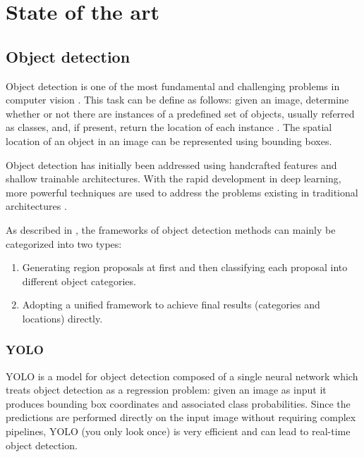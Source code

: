 \chapter{State of the art}
\label{chap:sota}

\section{Object detection}

Object detection is one of the most fundamental and challenging problems in computer vision \cite{zou2019object}. This task can be define as follows: given an image, determine whether or not there are instances of a predefined set of objects, usually referred as classes, and, if present, return the location of each instance \cite{liu2020deep}. The spatial location of an object in an image can be represented using bounding boxes.

Object detection has initially been addressed using handcrafted features and shallow trainable architectures.
With the rapid development in deep learning, more powerful techniques are used to address the problems existing in traditional architectures \cite{zhao2019object}. 

As described in \cite{zhao2019object}, the frameworks of object detection methods can mainly be categorized into two types:
\begin{enumerate}
    \item Generating region proposals at first and then classifying each proposal into different object categories.
    \item Adopting a unified framework to achieve final results (categories and locations) directly.
\end{enumerate} 

\subsection{YOLO}
YOLO \cite{redmon2016you} is a model for object detection composed of a single neural network which treats object detection as a regression problem: given an image as input it produces bounding box coordinates and associated class probabilities. Since the predictions are performed directly on the input image without requiring complex pipelines, YOLO (you only look once) is very efficient and can lead to real-time object detection.

